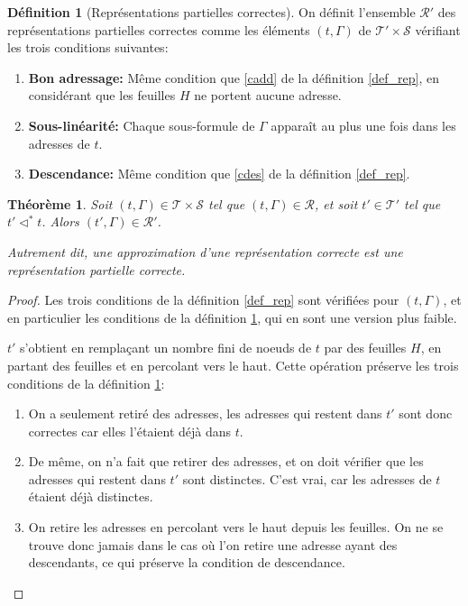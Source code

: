 \documentclass[11pt,a4paper]{article}
\theoremstyle{plain}
\newtheorem{theorem}{Théorème}
\theoremstyle{definition}
\newtheorem{definition}{Définition}
\theoremstyle{remark}
\newcommand*{\sequent}{\Gamma}
\newcommand*{\sequents}{\ensuremath{\mathcal{S}}}
\newcommand*{\trees}{\ensuremath{\mathcal{T}}}
\newcommand*{\treespartial}{\ensuremath{\mathcal{T'}}}
\newcommand*{\representationslarge}{\ensuremath{\trees \times \sequents}}
\newcommand*{\representations}{\ensuremath{\mathcal{R}}}
\newcommand*{\representationspartiallarge}{\ensuremath{\treespartial \times \sequents}}
\newcommand*{\representationspartial}{\ensuremath{\mathcal{R'}}}
\newcommand*{\relapprox}{\ensuremath{\triangleleft}}
\newcommand*{\relapproxlarge}{\ensuremath{\relapprox^*}}
\newcommand*{\unknown}{H}
\begin{document}
\begin{definition}[Représentations partielles correctes]
    \label{def_rep_partial}
    On définit l'ensemble \representationspartial{} des représentations partielles correctes comme les éléments $(t, \sequent)$ de $\representationspartiallarge$ vérifiant les trois conditions suivantes:
    
    \begin{enumerate}
    \item\label{caddpartial} \textbf{Bon adressage:} Même condition que \ref{cadd} de la définition \ref{def_rep}, en considérant que les feuilles $\unknown$ ne portent aucune adresse.
    \item\label{clinpartial} \textbf{Sous-linéarité:} Chaque sous-formule de $\sequent$ apparaît au plus une fois dans les adresses de $t$.
    \item\label{cdespartial} \textbf{Descendance:} Même condition que \ref{cdes} de la définition \ref{def_rep}.
    \end{enumerate}
\end{definition}

\begin{theorem}
    Soit $(t, \sequent) \in \representationslarge$ tel que $(t, \sequent) \in \representations$, et soit $t' \in \treespartial$ tel que $t' \relapproxlarge t$. Alors $(t', \sequent) \in \representationspartial$.
    
    Autrement dit, une approximation d'une représentation correcte est une représentation partielle correcte.
\end{theorem}

\begin{proof}
    Les trois conditions de la définition \ref{def_rep} sont vérifiées pour $(t, \sequent)$, et en particulier les conditions de la définition \ref{def_rep_partial}, qui en sont une version plus faible. 
    
    $t'$ s'obtient en remplaçant un nombre fini de noeuds de $t$ par des feuilles $\unknown$, en partant des feuilles et en percolant vers le haut. Cette opération préserve les trois conditions de la définition \ref{def_rep_partial}:

    \begin{enumerate}
        \item On a seulement retiré des adresses, les adresses qui restent dans $t'$ sont donc correctes car elles l'étaient déjà dans $t$.

        \item De même, on n'a fait que retirer des adresses, et on doit vérifier que les adresses qui restent dans $t'$ sont distinctes. C'est vrai, car les adresses de $t$ étaient déjà distinctes.

        \item On retire les adresses en percolant vers le haut depuis les feuilles. On ne se trouve donc jamais dans le cas où l'on retire une adresse ayant des descendants, ce qui préserve la condition de descendance.
    \end{enumerate}
\end{proof}
\end{document}
